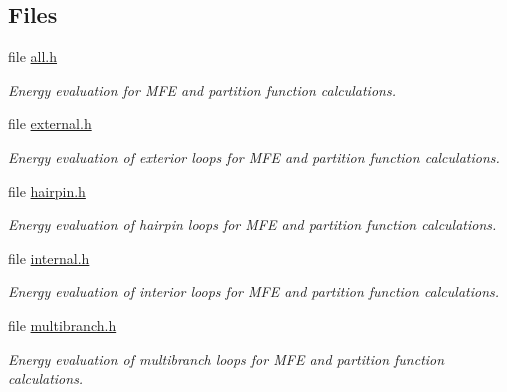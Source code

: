 \subsection*{Files}
\begin{DoxyCompactItemize}
\item 
file \hyperlink{all_8h}{all.\+h}
\begin{DoxyCompactList}\small\item\em Energy evaluation for M\+FE and partition function calculations. \end{DoxyCompactList}\item 
file \hyperlink{external_8h}{external.\+h}
\begin{DoxyCompactList}\small\item\em Energy evaluation of exterior loops for M\+FE and partition function calculations. \end{DoxyCompactList}\item 
file \hyperlink{hairpin_8h}{hairpin.\+h}
\begin{DoxyCompactList}\small\item\em Energy evaluation of hairpin loops for M\+FE and partition function calculations. \end{DoxyCompactList}\item 
file \hyperlink{internal_8h}{internal.\+h}
\begin{DoxyCompactList}\small\item\em Energy evaluation of interior loops for M\+FE and partition function calculations. \end{DoxyCompactList}\item 
file \hyperlink{multibranch_8h}{multibranch.\+h}
\begin{DoxyCompactList}\small\item\em Energy evaluation of multibranch loops for M\+FE and partition function calculations. \end{DoxyCompactList}\end{DoxyCompactItemize}
